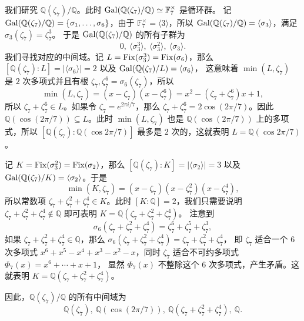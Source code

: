 \begin{example}\label{exa:Q7}
  我们研究 $\mathbb{Q}(\zeta_7)/\mathbb{Q}$。此时 $\operatorname{Gal}(\mathbb{Q}(\zeta_7)/\mathbb{Q})\simeq \mathbb{F}_7^\times$ 是循环群。
  记 $\operatorname{Gal}(\mathbb{Q}(\zeta_7)/\mathbb{Q})=\{\sigma_1,\dots,\sigma_6\}$，由于 $\mathbb{F}_7^\times=\langle 3\rangle$，所以
  $\operatorname{Gal}(\mathbb{Q}(\zeta_7)/\mathbb{Q})=\langle\sigma_3\rangle$，满足 $\sigma_3(\zeta_7)=\zeta_7^3$。
  于是 $\operatorname{Gal}(\mathbb{Q}(\zeta_7)/\mathbb{Q})$ 的所有子群为
  \[
    0,\ \langle \sigma_3^3\rangle,\ \langle\sigma_3^2\rangle,\ \langle\sigma_3\rangle.
  \]
  我们寻找对应的中间域。记 $L=\operatorname{Fix}(\sigma_3^3)=\operatorname{Fix}(\sigma_6)$，那么 $[\mathbb{Q}(\zeta_7):L]=|\langle\sigma_6\rangle|=2$
  以及 $\operatorname{Gal}(\mathbb{Q}(\zeta_7)/L)=\langle\sigma_6\rangle$，
  这意味着 $\min(L,\zeta_7)$ 是 $2$ 次多项式并且有根 $\zeta_7,\zeta_7^6=\sigma_6(\zeta_7)$，所以 
  \[
    \min(L,\zeta_7)=(x-\zeta_7)(x-\zeta_7^6)=x^2-(\zeta_7+\zeta_7^6)x+1,
  \]
  所以 $\zeta_7+\zeta_7^6\in L$。如果令 $\zeta_7=e^{2\pi i/7}$，那么 
  $\zeta_7+\zeta_7^6=2\cos(2\pi/7)$。因此 $\mathbb{Q}(\cos(2\pi/7))\subseteq L$。此时
  $\min(L,\zeta_7)$ 也是 $\mathbb{Q}(\cos(2\pi/7))$ 上的多项式，所以 $[\mathbb{Q}(\zeta_7):\mathbb{Q}(\cos 2\pi/7)]$
  最多是 $2$ 次的，这就表明 $L=\mathbb{Q}(\cos 2\pi/7)$。

  记 $K=\operatorname{Fix}(\sigma_3^2)=\operatorname{Fix}(\sigma_2)$，那么 $[\mathbb{Q}(\zeta_7):K]=|\langle\sigma_2\rangle|=3$
  以及 $\operatorname{Gal}(\mathbb{Q}(\zeta_7)/K)=\langle\sigma_2\rangle$。于是
  \[
    \min(K,\zeta_7)=(x-\zeta_7)(x-\zeta_7^2)(x-\zeta_7^4),
  \]
  所以常数项 $\zeta_7+\zeta_7^2+\zeta_7^4\in K$。此时 $[K:\mathbb{Q}]=2$，我们只需要说明
  $\zeta_7+\zeta_7^2+\zeta_7^4\notin \mathbb{Q}$ 即可表明 $K=\mathbb{Q}(\zeta_7+\zeta_7^2+\zeta_7^4)$。
  注意到
  \[
    \sigma_6(\zeta_7+\zeta_7^2+\zeta_7^4)=\zeta_7^6+\zeta_7^5+\zeta_7^3,
  \]
  如果 $\zeta_7+\zeta_7^2+\zeta_7^4\in \mathbb{Q}$，那么 $\sigma_6(\zeta_7+\zeta_7^2+\zeta_7^4)=\zeta_7+\zeta_7^2+\zeta_7^4$，
  即 $\zeta_7$ 适合一个 $6$ 次多项式 $x^6+x^5-x^4+x^3-x^2-x$，同时 $\zeta_7$ 适合不可约多项式 $\Phi_7(x)=x^6+\cdots+x+1$，
  显然 $\Phi_7(x)$ 不整除这个 $6$ 次多项式，产生矛盾。这就表明 $K=\mathbb{Q}(\zeta_7+\zeta_7^2+\zeta_7^4)$。

  因此，$\mathbb{Q}(\zeta_7)/\mathbb{Q}$ 的所有中间域为
  \[
    \mathbb{Q}(\zeta_7),\ \mathbb{Q}(\cos(2\pi/7)),\ \mathbb{Q}(\zeta_7+\zeta_7^2+\zeta_7^4),\ \mathbb{Q}.
  \]
\end{example}

